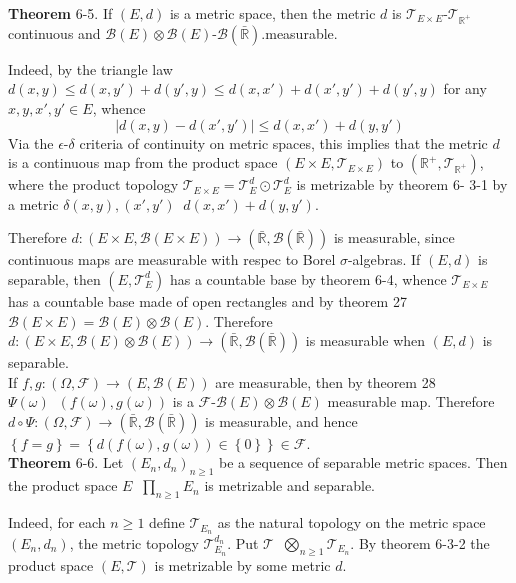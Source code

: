 \documentclass[a4paper]{article}
\newcommand{\obj}[1]{\left\{ #1 \right \}}
\newcommand{\brac}[1]{\left ( #1 \right )}
\newcommand{\abs}[1]{\left | #1 \right |}
\newcommand{\Rbar}{{\bar{\mathbb{R}}}}
\newcommand{\Real}{\mathbb{R}}
\newcommand{\Tcal}{\mathcal{T}}
\newcommand{\Fcal}{\mathcal{F}}
\newcommand{\borel}[1]{\mathcal{B}\brac{#1}}
\newcommand{\defn}{\mathop{\overset{\Delta}{=}}\nolimits}
\begin{document}
\label{thm:metric_product_contin} \noindent \textbf{Theorem} 6-5.
If $\brac{E,d}$ is a metric space, then the metric $d$ is $\Tcal_{E\times E}$-$\Tcal_{\Real^+}$ continuous and $\borel{E}\otimes\borel{E}$-$\borel{\Rbar}$.measurable.

Indeed, by the triangle law $d\brac{x,y} \leq d\brac{x,y'} + d\brac{y',y} \leq d\brac{x,x'} + d\brac{x',y'} + d\brac{y',y}$ for any $x,y,x',y'\in E$, whence \[ \abs{ d\brac{x,y} - d\brac{x',y'}} \leq d\brac{x,x'} + d\brac{y,y'} \] Via the $\epsilon$-$\delta$ criteria of continuity on metric spaces, this implies that the metric $d$ is a continuous map from the product space $\brac{E\times E, \Tcal_{E\times E}}$ to $\brac{\Real^+, \Tcal_{\Real^+}}$, where the product topology $\Tcal_{E\times E} = \Tcal_E^d \odot \Tcal_E^d$ is metrizable by theorem 6- 3-1 by a metric $\delta{\brac{x,y}, \brac{x',y'}} \defn d\brac{x, x'} + d\brac{y,y'}$.

Therefore $d:\brac{E\times E, \borel{E\times E} }\to \brac{\Rbar, \borel{\Rbar}}$ is measurable, since continuous maps are measurable with respec to Borel $\sigma$-algebras. If $\brac{E, d}$ is separable, then $\brac{E, \Tcal_E^d}$ has a countable base by theorem 6-4, whence $\Tcal_{E\times E}$ has a countable base made of open rectangles and by theorem 27 $\borel{E\times E} = \borel{E} \otimes \borel{E}$. Therefore $d:\brac{E\times E, \borel{E}\otimes \borel{E}}\to \brac{\Rbar, \borel{\Rbar} }$ is measurable when $\brac{E, d}$ is separable.\\

If $f,g:\brac{\Omega, \Fcal}\to \brac{ E, \borel{E} }$ are measurable, then by theorem 28 $\Psi\brac{\omega}\defn\brac{f\brac{\omega}, g\brac{\omega}}$ is a $\Fcal$-$\borel{E}\otimes \borel{E}$ measurable map. Therefore $d\circ \Psi:\brac{\Omega, \Fcal}\to \brac{\Rbar, \borel{\Rbar}}$ is measurable, and hence $\obj{ f = g } = \obj{ d\brac{f\brac{\omega}, g\brac{\omega} } \in \obj{ 0 } } \in \Fcal$.\\

\label{thm:count_sepa_metric_spaces} \noindent \textbf{Theorem} 6-6.
Let $\brac{E_n, d_n}_{n\geq1}$ be a sequence of separable metric spaces. Then the product space $E\defn \prod_{n\geq1} E_n$ is metrizable and separable.

Indeed, for each $n\geq1$ define $\Tcal_{E_n}$ as the natural topology on the metric space $\brac{E_n, d_n}$, the metric topology $\Tcal_{E_n}^{d_n}$. Put $\Tcal\defn \bigotimes_{n\geq1} \Tcal_{E_n}$. By theorem 6-3-2 the product space $\brac{E, \Tcal}$ is metrizable by some metric $d$.
\end{document}
